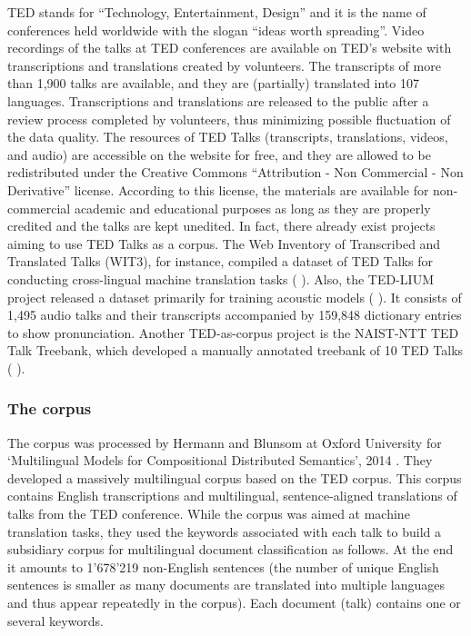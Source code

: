 TED stands for “Technology, Entertainment, Design” and it is the name of conferences held worldwide with the slogan “ideas worth spreading”. Video recordings of the talks at TED conferences are available on TED’s website with transcriptions and translations created by volunteers. The transcripts of more than 1,900 talks are available, and they are (partially) translated into 107 languages. Transcriptions and translations are released to the public after a review process completed by volunteers, thus minimizing possible fluctuation of the data quality.
The resources of TED Talks (transcripts, translations, videos, and audio) are accessible on the website for free, and they are allowed to be redistributed under the Creative Commons “Attribution - Non Commercial - Non Derivative” license. According to this license, the materials are available for non-commercial academic and
educational purposes as long as they are properly credited and the talks are kept unedited.
In fact, there already exist projects aiming to use TED Talks as a corpus. The Web Inventory of Transcribed and Translated Talks (WIT3), for instance, compiled a dataset of TED Talks for conducting cross-lingual machine translation tasks (\citeauthor{mauro2012wit3} \citeyear{mauro2012wit3} \cite{mauro2012wit3}). Also, the TED-LIUM project released a dataset primarily for training acoustic models (\citeauthor{rousseau2014enhancing} \citeyear{rousseau2014enhancing} \cite{rousseau2014enhancing}). It consists of 1,495 audio talks and their transcripts accompanied by 159,848 dictionary entries to show pronunciation. Another TED-as-corpus project is the NAIST-NTT TED Talk Treebank, which developed a manually annotated treebank of 10 TED Talks (\citeauthor{neubig2014naist} \citeyear{neubig2014naist} \cite{neubig2014naist}).

\subsubsection{The corpus}

The corpus was processed by Hermann and Blunsom at Oxford University for \enquote*{Multilingual Models for Compositional Distributed Semantics}, 2014 \cite{hermann2014multilingual}. They developed a massively multilingual corpus based on the TED corpus. This corpus contains English transcriptions and multilingual, sentence-aligned translations of talks from the TED conference.
While the corpus was aimed at machine translation tasks, they used the keywords associated with each talk to build a subsidiary corpus for multilingual document classification as follows.
At the end it amounts to 1'678'219 non-English sentences (the number of unique English sentences is smaller as many documents are translated into multiple languages and thus appear repeatedly in the corpus). Each document (talk) contains one or several keywords.
